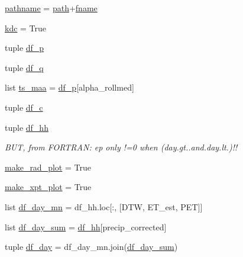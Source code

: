 \begin{DoxyCompactItemize}
\hyperlink{namespaces__post__process_a0b1be5e969443e66bb9beaa3b43cef54}{pathname} = \hyperlink{namespaces__post__process_a57eb09f6e1e700924ee93b619e0ee863}{path}+\hyperlink{namespaces__post__process_a21843322f9c0bc1447e3fcf8b98c75f1}{fname}
\item 
\hyperlink{namespaces__post__process_a516eea1289ef3a804cf67e0365d78623}{kdc} = True
\item 
tuple \hyperlink{namespaces__post__process_a7c2928665b805f82e2f875eabbbc8cc7}{df\+\_\+p}
\item 
tuple \hyperlink{namespaces__post__process_a786c188707f3609514c3f64b95e67f7e}{df\+\_\+q}
\item 
list \hyperlink{namespaces__post__process_a62c0d70001797ee6bd82752773e064b7}{ts\+\_\+maa} = \hyperlink{namespaces__post__process_a7c2928665b805f82e2f875eabbbc8cc7}{df\+\_\+p}\mbox{[}\textquotesingle{}alpha\+\_\+rollmed\textquotesingle{}\mbox{]}
\item 
tuple \hyperlink{namespaces__post__process_addd6baa1416f79361bce8b4fbe5deb58}{df\+\_\+c}
\item 
tuple \hyperlink{namespaces__post__process_aecff5690de1809fbb2de43b409ab9577}{df\+\_\+hh}
\begin{DoxyCompactList}\small\item\em B\+U\+T, from F\+O\+R\+T\+R\+A\+N\+: ep only !=0 when (day.\+gt..\+and.\+day.\+lt.)!! \end{DoxyCompactList}\item 
\hyperlink{namespaces__post__process_aa86c5a7587bc6a969a974c1fea5c1435}{make\+\_\+rad\+\_\+plot} = True
\item 
\hyperlink{namespaces__post__process_af1070685db63f676b11421534fe570e9}{make\+\_\+xpt\+\_\+plot} = True
\item 
list \hyperlink{namespaces__post__process_a141e240af1e17cf00558c3487a94a0e9}{df\+\_\+day\+\_\+mn} = df\+\_\+hh.\+loc\mbox{[}\+:, \mbox{[}\textquotesingle{}D\+T\+W\textquotesingle{}, \textquotesingle{}E\+T\+\_\+est\textquotesingle{}, \textquotesingle{}P\+E\+T\textquotesingle{}\mbox{]}\mbox{]}
\item 
list \hyperlink{namespaces__post__process_a7ccff9385178571e9d3332fde7720e82}{df\+\_\+day\+\_\+sum} = \hyperlink{namespaces__post__process_aecff5690de1809fbb2de43b409ab9577}{df\+\_\+hh}\mbox{[}\textquotesingle{}precip\+\_\+corrected\textquotesingle{}\mbox{]}
\item 
tuple \hyperlink{namespaces__post__process_a97279c14527d8c47412cec3c686f0d46}{df\+\_\+day} = df\+\_\+day\+\_\+mn.\+join(\hyperlink{namespaces__post__process_a7ccff9385178571e9d3332fde7720e82}{df\+\_\+day\+\_\+sum})

\end{DoxyCompactItemize}
